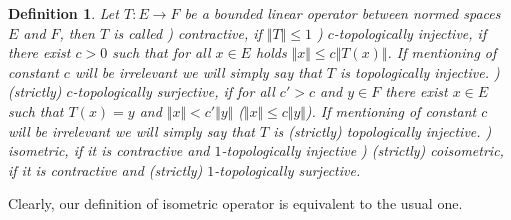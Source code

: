 \documentclass[12pt]{article}
\newtheorem{definition}[theorem]{Definition}
\begin{document}
\begin{definition}\label{DefNorOpType} Let $ T:E\to F$ be a bounded linear operator between normed spaces $E$ and $F$, then $ T$ is called
) contractive, if $\Vert T\Vert\leq 1$
) \textit{$c$-topologically injective}, if there exist $c > 0$ such that for all $x \in E$ holds $\Vert x\Vert\leq c\Vert  T(x)\Vert$. If mentioning of constant $c$ will be irrelevant we will simply say that $ T$ is topologically injective.
) \textit{(strictly) $c$-topologically surjective}, if for all $c'>c$ and  $y\in F$ there exist $x \in E$ such that $ T(x) = y$ and $\Vert x \Vert < c' \Vert y \Vert$ ($\Vert x \Vert \leq c \Vert y \Vert$). 
If mentioning of constant $c$ will be irrelevant we will simply say that $ T$ is (strictly) topologically injective.
) isometric, if it is contractive and $1$-topologically injective
) (strictly) coisometric, if it is contractive and (strictly) $1$-topologically surjective.
\end{definition}

Clearly, our definition of isometric operator is equivalent to the usual one.
\end{document}
